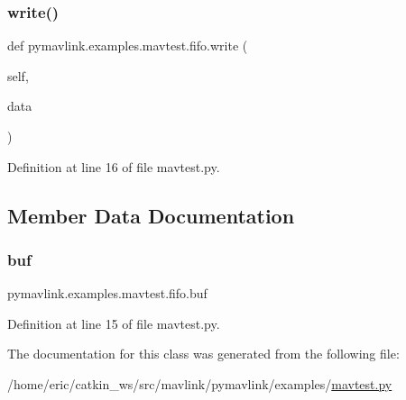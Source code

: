 \mbox{\label{classpymavlink_1_1examples_1_1mavtest_1_1fifo_a88329c0b05c02157f63f92b6a279d2d4}} 
\subsubsection{\texorpdfstring{write()}{write()}}
{\footnotesize\ttfamily def pymavlink.\+examples.\+mavtest.\+fifo.\+write (\begin{DoxyParamCaption}\item[{}]{self,  }\item[{}]{data }\end{DoxyParamCaption})}



Definition at line 16 of file mavtest.\+py.



\subsection{Member Data Documentation}
\mbox{\label{classpymavlink_1_1examples_1_1mavtest_1_1fifo_a6344690e21814b0d91f6f52c0dd4d27c}} 
\subsubsection{\texorpdfstring{buf}{buf}}
{\footnotesize\ttfamily pymavlink.\+examples.\+mavtest.\+fifo.\+buf}



Definition at line 15 of file mavtest.\+py.



The documentation for this class was generated from the following file\+:\begin{DoxyCompactItemize}
\item 
/home/eric/catkin\+\_\+ws/src/mavlink/pymavlink/examples/\mbox{\hyperlink{mavtest_8py}{mavtest.\+py}}\end{DoxyCompactItemize}
